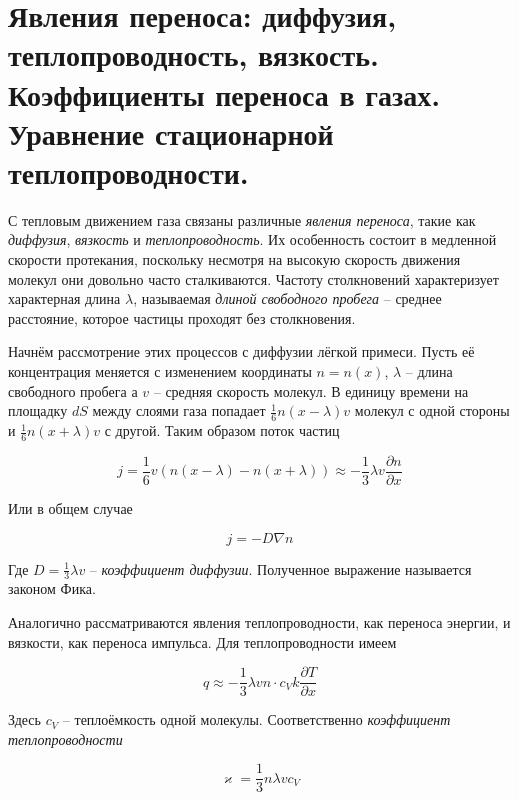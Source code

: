 \section{Явления переноса: диффузия, теплопроводность, вязкость. Коэффициенты переноса в газах. Уравнение стационарной теплопроводности.}

С тепловым движением газа связаны различные \textit{явления переноса}, такие как \textit{диффузия}, \textit{вязкость} и \textit{теплопроводность}. Их особенность состоит в медленной скорости протекания, поскольку несмотря на высокую скорость движения молекул они довольно часто сталкиваются. Частоту столкновений характеризует характерная длина $\lambda$, называемая \textit{длиной свободного пробега} -- среднее расстояние, которое частицы проходят без столкновения.

Начнём рассмотрение этих процессов с диффузии лёгкой примеси. Пусть её концентрация меняется с изменением координаты $n = n(x)$, $\lambda$ -- длина свободного пробега а $v$ -- средняя скорость молекул. В единицу времени на площадку $dS$ между слоями газа попадает $\frac{1}{6} n(x - \lambda) v$ молекул с одной стороны и $\frac{1}{6} n(x + \lambda) v$ с другой. Таким образом поток частиц

\begin{equation*}
    j = \frac{1}{6} v \left( n(x - \lambda) - n(x + \lambda)\right) \approx - \frac{1}{3} \lambda v \frac{\partial n}{\partial x}
\end{equation*}

\noindent
Или в общем случае

\begin{equation}
    j = - D \nabla n
\end{equation}

\noindent
Где $D = \frac{1}{3} \lambda v$ -- \textit{коэффициент диффузии}. Полученное выражение называется законом Фика.

Аналогично рассматриваются явления теплопроводности, как переноса энергии, и вязкости, как переноса импульса. Для теплопроводности имеем

\begin{equation}
    q \approx - \frac{1}{3} \lambda v n \cdot c_V k \frac{\partial T}{\partial x}
\end{equation}

\noindent
Здесь $c_V$ -- теплоёмкость одной молекулы. Соответственно \textit{коэффициент теплопроводности}

\begin{equation}
    \varkappa = \frac{1}{3} n \lambda v c_V
\end{equation}

